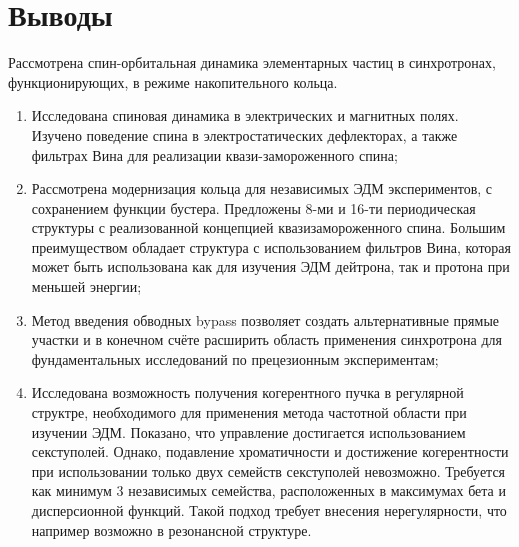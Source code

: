 \section*{Выводы}
\par Рассмотрена спин-орбитальная динамика элементарных частиц в синхротронах, функционирующих, в режиме накопительного кольца. 

\begin{enumerate}

\item Исследована спиновая динамика в электрических и магнитных полях. Изучено поведение спина в электростатических дефлекторах, а также фильтрах Вина для реализации квази-замороженного спина;

\item Рассмотрена модернизация кольца для независимых ЭДМ экспериментов, с сохранением функции бустера. Предложены 8-ми и 16-ти периодическая структуры с реализованной концепцией квазизамороженного спина. Большим преимуществом обладает структура с использованием фильтров Вина, которая может быть использована как для изучения ЭДМ дейтрона, так и протона при меньшей энергии;

\item Метод введения обводных bypass позволяет создать альтернативные прямые участки и в конечном счёте расширить область применения синхротрона для фундаментальных исследований по прецезионным экспериментам; 

\item Исследована возможность получения когерентного пучка в регулярной структре, необходимого для применения метода частотной области при изучении ЭДМ. Показано, что управление достигается использованием секступолей. Однако, подавление хроматичности и достижение когерентности при использовании только двух семейств секступолей невозможно. Требуется как минимум 3 независимых семейства, расположенных в максимумах бета и дисперсионной функций. Такой подход требует внесения нерегулярности, что например возможно в резонансной структуре.

\end{enumerate}

\FloatBarrier
